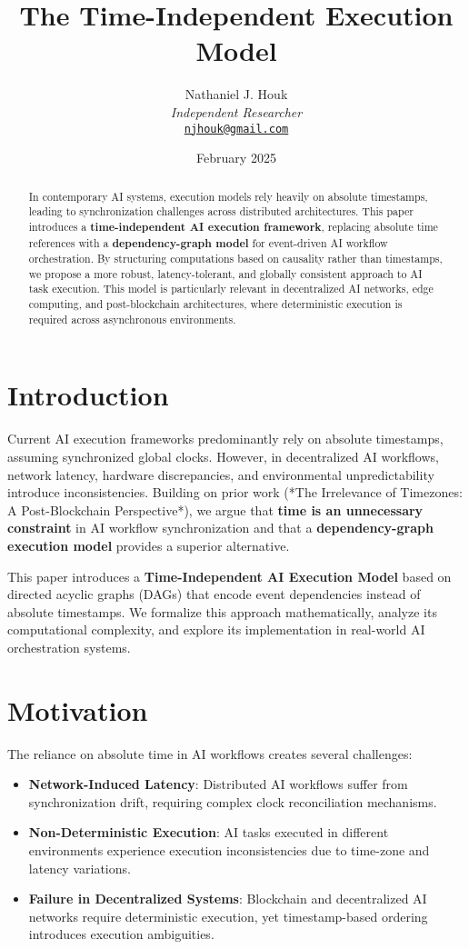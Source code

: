 \documentclass{article}
\title{The Time-Independent Execution Model}
\author{Nathaniel J. Houk\\
\textit{Independent Researcher}\\
\href{mailto:njhouk@gmail.com}{\texttt{njhouk@gmail.com}}}
\date{February 2025}
\begin{document}
\maketitle
\tableofcontents

\begin{abstract}
In contemporary AI systems, execution models rely heavily on absolute timestamps, leading to synchronization challenges across distributed architectures. This paper introduces a \textbf{time-independent AI execution framework}, replacing absolute time references with a \textbf{dependency-graph model} for event-driven AI workflow orchestration. By structuring computations based on causality rather than timestamps, we propose a more robust, latency-tolerant, and globally consistent approach to AI task execution. This model is particularly relevant in decentralized AI networks, edge computing, and post-blockchain architectures, where deterministic execution is required across asynchronous environments.
\end{abstract}

\section{Introduction}
Current AI execution frameworks predominantly rely on absolute timestamps, assuming synchronized global clocks. However, in decentralized AI workflows, network latency, hardware discrepancies, and environmental unpredictability introduce inconsistencies. Building on prior work (*The Irrelevance of Timezones: A Post-Blockchain Perspective*), we argue that \textbf{time is an unnecessary constraint} in AI workflow synchronization and that a \textbf{dependency-graph execution model} provides a superior alternative.

This paper introduces a \textbf{Time-Independent AI Execution Model} based on directed acyclic graphs (DAGs) that encode event dependencies instead of absolute timestamps. We formalize this approach mathematically, analyze its computational complexity, and explore its implementation in real-world AI orchestration systems.

\section{Motivation}
The reliance on absolute time in AI workflows creates several challenges:
\begin{itemize}
    \item \textbf{Network-Induced Latency}: Distributed AI workflows suffer from synchronization drift, requiring complex clock reconciliation mechanisms.
    \item \textbf{Non-Deterministic Execution}: AI tasks executed in different environments experience execution inconsistencies due to time-zone and latency variations.
    \item \textbf{Failure in Decentralized Systems}: Blockchain and decentralized AI networks require deterministic execution, yet timestamp-based ordering introduces execution ambiguities.
\end{itemize}
\end{document}
